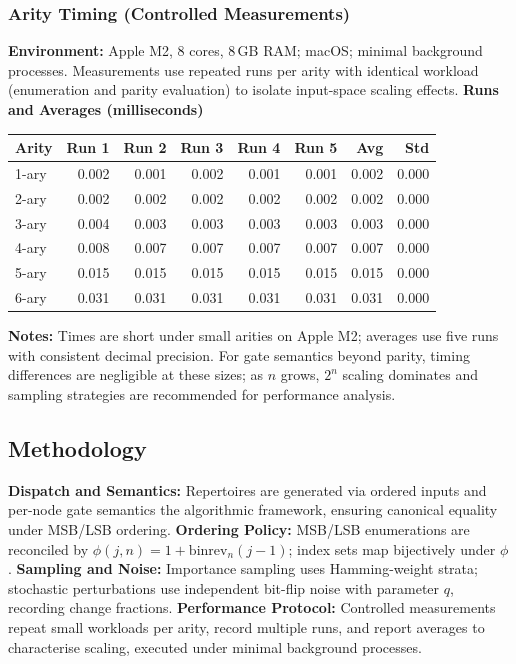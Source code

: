 \subsubsection{Arity Timing (Controlled Measurements)}
\textbf{Environment:} Apple M2, 8 cores, 8\,GB RAM; macOS; minimal background processes. Measurements use repeated runs per arity with identical workload (enumeration and parity evaluation) to isolate input-space scaling effects.
\textbf{Runs and Averages (milliseconds)}
\begin{center}
\begin{tabular}{lrrrrr rr}
\toprule
Arity & Run 1 & Run 2 & Run 3 & Run 4 & Run 5 & Avg & Std \\
\midrule
1-ary & 0.002 & 0.001 & 0.002 & 0.001 & 0.001 & 0.002 & 0.000 \\
2-ary & 0.002 & 0.002 & 0.002 & 0.002 & 0.002 & 0.002 & 0.000 \\
3-ary & 0.004 & 0.003 & 0.003 & 0.003 & 0.003 & 0.003 & 0.000 \\
4-ary & 0.008 & 0.007 & 0.007 & 0.007 & 0.007 & 0.007 & 0.000 \\
5-ary & 0.015 & 0.015 & 0.015 & 0.015 & 0.015 & 0.015 & 0.000 \\
6-ary & 0.031 & 0.031 & 0.031 & 0.031 & 0.031 & 0.031 & 0.000 \\
\bottomrule
\end{tabular}
\end{center}
\textbf{Notes:} Times are short under small arities on Apple M2; averages use five runs with consistent decimal precision. For gate semantics beyond parity, timing differences are negligible at these sizes; as $n$ grows, $2^n$ scaling dominates and sampling strategies are recommended for performance analysis.



\subsection{Methodology}
\textbf{Dispatch and Semantics:} Repertoires are generated via ordered inputs and per-node gate semantics the algorithmic framework, ensuring canonical equality under MSB/LSB ordering.
\textbf{Ordering Policy:} MSB/LSB enumerations are reconciled by $\phi(j,n)=1+\mathrm{binrev}_n(j-1)$; index sets map bijectively under $\phi$.
\textbf{Sampling and Noise:} Importance sampling uses Hamming-weight strata; stochastic perturbations use independent bit-flip noise with parameter $q$, recording change fractions.
\textbf{Performance Protocol:} Controlled measurements repeat small workloads per arity, record multiple runs, and report averages to characterise scaling, executed under minimal background processes.

